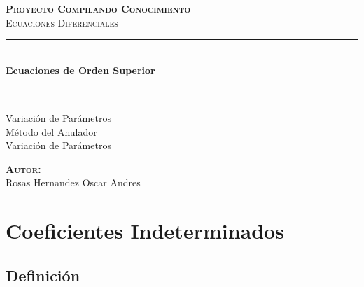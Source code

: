 \documentclass[12pt]{report}                                %
\author{Oscar Andrés Rosas}                                 %
\begin{document}
\begin{titlepage}

    \center
    \textbf{\textsc{\Large Proyecto Compilando Conocimiento}}\\[1.0cm] 
    \textsc{\Large Ecuaciones Diferenciales}\\[1.0cm] 

    \rule{\linewidth}{0.5mm} \\[1.0cm]
        { \huge \bfseries Ecuaciones de Orden Superior}\\[1.0cm] 
    \rule{\linewidth}{0.5mm} \\[2.0cm]
    
    {\LARGE Variación de Parámetros}\\[1cm] 
    {\LARGE Método del Anulador}\\[1cm] 
    {\LARGE Variación de Parámetros}\\[3cm] 
    
    \begin{center} \large
    \textbf{\textsc{Autor:}}\\
    Rosas Hernandez Oscar Andres
    \end{center}

    \vfill

\end{titlepage}


\tableofcontents{}
\clearpage

\chapter{Coeficientes Indeterminados}
    \clearpage

    \section{Definición}
\end{document}

